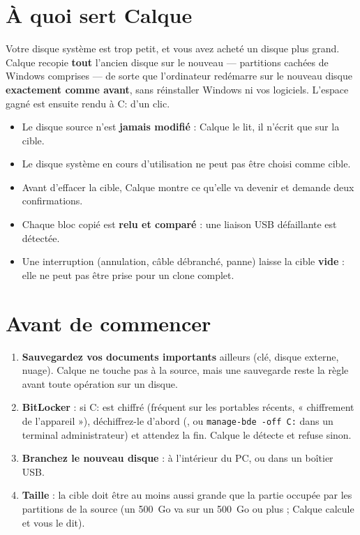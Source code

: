 \tableofcontents
\newpage

\section{À quoi sert Calque}

Votre disque système est trop petit, et vous avez acheté un disque plus grand. Calque recopie
\textbf{tout} l'ancien disque sur le nouveau — partitions cachées de Windows comprises — de sorte
que l'ordinateur redémarre sur le nouveau disque \textbf{exactement comme avant}, sans réinstaller
Windows ni vos logiciels. L'espace gagné est ensuite rendu à C: d'un clic.

\begin{securitebox}
\begin{itemize}
\item Le disque source n'est \textbf{jamais modifié} : Calque le lit, il n'écrit que sur la cible.
\item Le disque système en cours d'utilisation ne peut pas être choisi comme cible.
\item Avant d'effacer la cible, Calque montre ce qu'elle va devenir et demande deux confirmations.
\item Chaque bloc copié est \textbf{relu et comparé} : une liaison USB défaillante est détectée.
\item Une interruption (annulation, câble débranché, panne) laisse la cible \textbf{vide} : elle ne
      peut pas être prise pour un clone complet.
\end{itemize}
\end{securitebox}

\section{Avant de commencer}

\begin{enumerate}
\item \textbf{Sauvegardez vos documents importants} ailleurs (clé, disque externe, nuage). Calque ne
      touche pas à la source, mais une sauvegarde reste la règle avant toute opération sur un disque.
\item \textbf{BitLocker} : si C: est chiffré (fréquent sur les portables récents, « chiffrement de
      l'appareil »), déchiffrez-le d'abord (, ou \texttt{manage-bde -off C:} dans un terminal administrateur) et
      attendez la fin. Calque le détecte et refuse sinon.
\item \textbf{Branchez le nouveau disque} : à l'intérieur du PC, ou dans un boîtier USB.
\item \textbf{Taille} : la cible doit être au moins aussi grande que la partie occupée par les
      partitions de la source (un 500~Go va sur un 500~Go ou plus ; Calque calcule et vous le dit).
\end{enumerate}

